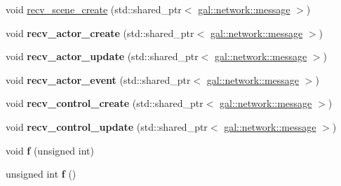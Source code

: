 \begin{DoxyCompactItemize}
\item 
void \hyperlink{classNeb_1_1app_acefbc3bb3de71f3c8cca0afc1fada857}{recv\-\_\-scene\-\_\-create} (std\-::shared\-\_\-ptr$<$ \hyperlink{classgal_1_1network_1_1message}{gal\-::network\-::message} $>$)
\item 
\hypertarget{classNeb_1_1app_a454da3e291e16b2d0982099e5277c81b}{void {\bfseries recv\-\_\-actor\-\_\-create} (std\-::shared\-\_\-ptr$<$ \hyperlink{classgal_1_1network_1_1message}{gal\-::network\-::message} $>$)}\label{classNeb_1_1app_a454da3e291e16b2d0982099e5277c81b}

\item 
\hypertarget{classNeb_1_1app_a6b727dbcc2fd814a3513678424c88496}{void {\bfseries recv\-\_\-actor\-\_\-update} (std\-::shared\-\_\-ptr$<$ \hyperlink{classgal_1_1network_1_1message}{gal\-::network\-::message} $>$)}\label{classNeb_1_1app_a6b727dbcc2fd814a3513678424c88496}

\item 
\hypertarget{classNeb_1_1app_ab7ca6fa6c02a538c380f1c1bf9c49fc8}{void {\bfseries recv\-\_\-actor\-\_\-event} (std\-::shared\-\_\-ptr$<$ \hyperlink{classgal_1_1network_1_1message}{gal\-::network\-::message} $>$)}\label{classNeb_1_1app_ab7ca6fa6c02a538c380f1c1bf9c49fc8}

\item 
\hypertarget{classNeb_1_1app_af9dfb6e16d0a0a2b1aea893c23110db1}{void {\bfseries recv\-\_\-control\-\_\-create} (std\-::shared\-\_\-ptr$<$ \hyperlink{classgal_1_1network_1_1message}{gal\-::network\-::message} $>$)}\label{classNeb_1_1app_af9dfb6e16d0a0a2b1aea893c23110db1}

\item 
\hypertarget{classNeb_1_1app_af78185f60b42955a1ac44e2dd3b16246}{void {\bfseries recv\-\_\-control\-\_\-update} (std\-::shared\-\_\-ptr$<$ \hyperlink{classgal_1_1network_1_1message}{gal\-::network\-::message} $>$)}\label{classNeb_1_1app_af78185f60b42955a1ac44e2dd3b16246}

\item 
\hypertarget{classNeb_1_1app_a373ce82cfb06b21444d90daeaa0900a5}{void {\bfseries f} (unsigned int)}\label{classNeb_1_1app_a373ce82cfb06b21444d90daeaa0900a5}

\item 
\hypertarget{classNeb_1_1app_a4158adddede1a017c151da072503dcad}{unsigned int {\bfseries f} ()}\label{classNeb_1_1app_a4158adddede1a017c151da072503dcad}

\end{DoxyCompactItemize}
